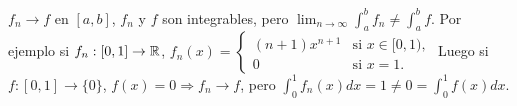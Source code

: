 \begin{note}
  \(f_n \to f\) en \([a, b]\), \(f_n\) y \(f\) son integrables, pero \(\lim_{n \to \infty} \int_a^b f_n \neq \int_a^b f\). Por ejemplo si \(f_n: [0, 1] \to \mathbb{R}\), \(f_n(x) = \begin{cases}
      (n+1) x^{n+1} & \text{si } x \in [0, 1), \\
      0             & \text{si } x = 1.
    \end{cases}\) Luego si \(f: [0, 1] \to \{0\}\), \(f(x) = 0 \Rightarrow f_n \to f\), pero \(\int_0^1 f_n(x) dx = 1 \neq 0 = \int_0^1 f(x) dx\).
\end{note}
